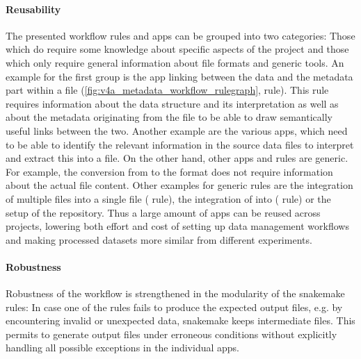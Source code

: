 \paragraph{Reusability}
The presented workflow rules and apps can be grouped into two categories: Those which do require some knowledge about specific aspects of the project and those which only require general information about file formats and generic tools. An  example for the first group is the app linking between the data and the metadata part within a  file (\cref{fig:v4a_metadata_workflow_rulegraph},  rule). This rule requires information about the data structure and its interpretation as well as about the metadata originating from the  file to be able to draw semantically useful links between the two. Another example are the various  apps, which need to be able to identify the relevant information in the source data files to interpret and extract this into a  file.
On the other hand, other apps and rules are generic. For example, the conversion from  to the  format does not require information about the actual file content. Other examples for generic rules are the integration of multiple  files into a single file ( rule), the integration of  into  ( rule) or the setup of the  repository. Thus a large amount of apps can be reused across projects, lowering both effort and cost of setting up data management workflows  and making processed datasets more similar from different experiments.

\paragraph{Robustness}
Robustness of the workflow is strengthened in the modularity of the snakemake rules: In case one of the rules fails to produce the expected output files, e.g. by encountering invalid or unexpected data, snakemake keeps intermediate files. This permits to generate output files under erroneous conditions without explicitly handling all possible exceptions in the individual apps.

